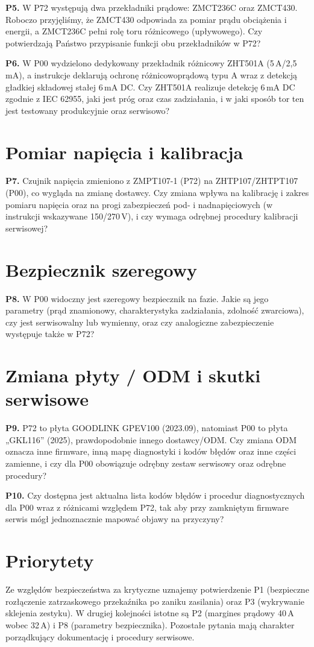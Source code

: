 \documentclass[11pt]{article}
\newcommand{\pyt}[1]{\textbf{\color{navy}#1}\hspace{0.4em}}
\begin{document}
\pyt{P5.} W P72 występują dwa przekładniki prądowe: ZMCT236C oraz ZMCT430. Roboczo przyjęliśmy, że ZMCT430 odpowiada za pomiar prądu obciążenia i energii, a ZMCT236C pełni rolę toru różnicowego (upływowego). Czy potwierdzają Państwo przypisanie funkcji obu przekładników w P72?

\pyt{P6.} W P00 wydzielono dedykowany przekładnik różnicowy ZHT501A (5\,A/2,5\,mA), a instrukcje deklarują ochronę różnicowoprądową typu A wraz z detekcją gładkiej składowej stałej 6\,mA DC. Czy ZHT501A realizuje detekcję 6\,mA DC zgodnie z IEC 62955, jaki jest próg oraz czas zadziałania, i w jaki sposób tor ten jest testowany produkcyjnie oraz serwisowo?

\section{Pomiar napięcia i kalibracja}

\pyt{P7.} Czujnik napięcia zmieniono z ZMPT107-1 (P72) na ZHTP107/ZHTPT107 (P00), co wygląda na zmianę dostawcy. Czy zmiana wpływa na kalibrację i zakres pomiaru napięcia oraz na progi zabezpieczeń pod- i nadnapięciowych (w instrukcji wskazywane 150/270\,V), i czy wymaga odrębnej procedury kalibracji serwisowej?

\section{Bezpiecznik szeregowy}

\pyt{P8.} W P00 widoczny jest szeregowy bezpiecznik na fazie. Jakie są jego parametry (prąd znamionowy, charakterystyka zadziałania, zdolność zwarciowa), czy jest serwisowalny lub wymienny, oraz czy analogiczne zabezpieczenie występuje także w P72?

\section{Zmiana płyty / ODM i skutki serwisowe}

\pyt{P9.} P72 to płyta GOODLINK GPEV100 (2023.09), natomiast P00 to płyta „GKL116'' (2025), prawdopodobnie innego dostawcy/ODM. Czy zmiana ODM oznacza inne firmware, inną mapę diagnostyki i kodów błędów oraz inne części zamienne, i czy dla P00 obowiązuje odrębny zestaw serwisowy oraz odrębne procedury?

\pyt{P10.} Czy dostępna jest aktualna lista kodów błędów i procedur diagnostycznych dla P00 wraz z różnicami względem P72, tak aby przy zamkniętym firmware serwis mógł jednoznacznie mapować objawy na przyczyny?

\section{Priorytety}

Ze względów bezpieczeństwa za krytyczne uznajemy potwierdzenie P1 (bezpieczne rozłączenie zatrzaskowego przekaźnika po zaniku zasilania) oraz P3 (wykrywanie sklejenia zestyku). W drugiej kolejności istotne są P2 (margines prądowy 40\,A wobec 32\,A) i P8 (parametry bezpiecznika). Pozostałe pytania mają charakter porządkujący dokumentację i procedury serwisowe.
\end{document}
